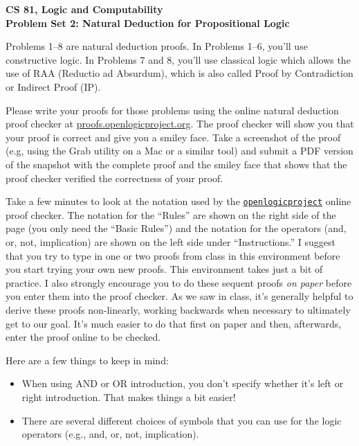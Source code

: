 \documentclass[12pt]{article}
\newcommand{\DoNotShare}{\large \noindent \textbf{Under the Harvey Mudd Honor Code, this document is not to be shared.} \normalsize}
\begin{document}
\begin{center}
	\bf
	CS 81, Logic and Computability  \\
	Problem Set 2:  Natural Deduction for Propositional Logic \\
\end{center}


Problems 1--8 are natural deduction proofs.
In Problems 1--6, you'll use constructive logic.  In Problems 7 and 8, you'll use classical logic which allows the use of RAA (Reductio ad Absurdum), which is also called Proof by Contradiction or Indirect Proof (IP).

Please write your proofs for those problems using the online natural deduction proof checker at \href{http://proofs.openlogicproject.org}{proofs.openlogicproject.org}.  The proof checker will show you that your proof is correct and give you a smiley face.  Take a screenshot of the proof (e.g, using the Grab utility on a Mac or a similar tool) and submit a PDF version of the snapshot with the complete proof and the smiley face that shows that the proof checker verified the correctness of your proof.

Take a few minutes to look at the notation used by the \href{http://proofs.openlogicproject.org}{\texttt{openlogicproject}} online proof checker.  The notation for the ``Rules'' are shown on the right side of the page (you only need the ``Basic Rules'')  and the notation for the operators (and, or, not, implication) are shown on the left side under ``Instructions.''  I suggest that you try to  type in one or two proofs from class in this environment before you start trying your own new proofs.  This environment takes just a bit of practice.  I also strongly encourage you to do these sequent proofs \emph{on paper} before you enter them into the proof checker.  As we saw in class, it's generally helpful to derive these proofs non-linearly, working backwards when necessary to ultimately get to our goal.  It's much easier to do that first on paper and then, afterwards, enter the proof online to be checked.

Here are a few things to keep in mind:
\begin{itemize}
	\item When using AND or OR introduction, you don't specify whether it's left or right introduction.  That makes things a bit easier! 
	\item There are several different choices of symbols that you can use for the logic operators (e.g., and, or, not, implication).
\end{itemize}
\end{document}

